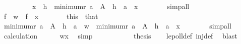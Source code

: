 \begin{isabellebody}
\ \ \ \ \ \ \ \ \ {\isachardoublequoteopen}x\ {\isacharequal}{\kern0pt}\ h\ {\isacharbackquote}{\kern0pt}\ minimum{\isacharparenleft}{\kern0pt}r{\isacharcomma}{\kern0pt}\ {\isacharbraceleft}{\kern0pt}a\ {\isasymin}\ A\ {\isachardot}{\kern0pt}\ h\ {\isacharbackquote}{\kern0pt}\ a\ {\isacharequal}{\kern0pt}\ x{\isacharbraceright}{\kern0pt}{\isacharparenright}{\kern0pt}{\isachardoublequoteclose}\isanewline
\ \ \ \ \ \ \isamarkupfalse%
\ simp{\isacharunderscore}{\kern0pt}all\ \ \isanewline
\ \ \ \ \isamarkupfalse%
\isanewline
\ \ \ \ \isamarkupfalse%
\ {\isachardoublequoteopen}{\isacharquery}{\kern0pt}f\ {\isacharbackquote}{\kern0pt}\ w\ {\isacharequal}{\kern0pt}\ {\isacharquery}{\kern0pt}f\ {\isacharbackquote}{\kern0pt}\ x{\isachardoublequoteclose}\isanewline
\ \ \ \ \isamarkupfalse%
\ \isamarkupfalse%
\ this\ \ that\isanewline
\ \ \ \ \isamarkupfalse%
\ {\isachardoublequoteopen}minimum{\isacharparenleft}{\kern0pt}r{\isacharcomma}{\kern0pt}\ {\isacharbraceleft}{\kern0pt}a\ {\isasymin}\ A\ {\isachardot}{\kern0pt}\ h\ {\isacharbackquote}{\kern0pt}\ a\ {\isacharequal}{\kern0pt}\ w{\isacharbraceright}{\kern0pt}{\isacharparenright}{\kern0pt}\ {\isacharequal}{\kern0pt}\ minimum{\isacharparenleft}{\kern0pt}r{\isacharcomma}{\kern0pt}\ {\isacharbraceleft}{\kern0pt}a\ {\isasymin}\ A\ {\isachardot}{\kern0pt}\ h\ {\isacharbackquote}{\kern0pt}\ a\ {\isacharequal}{\kern0pt}\ x{\isacharbraceright}{\kern0pt}{\isacharparenright}{\kern0pt}{\isachardoublequoteclose}\isanewline
\ \ \ \ \ \ \isamarkupfalse%
\ simp{\isacharunderscore}{\kern0pt}all\isanewline
\ \ \ \ \isamarkupfalse%
\ \isamarkupfalse%
\ calculation{\isacharparenleft}{\kern0pt}{}{\isacharcomma}{\kern0pt}{}{\isacharcomma}{\kern0pt}{}{\isacharparenright}{\kern0pt}\isanewline
\ \ \ \ \isamarkupfalse%
\ {\isachardoublequoteopen}w{\isacharequal}{\kern0pt}x{\isachardoublequoteclose}\ \isamarkupfalse%
\ simp\isanewline
\ \ \ \ \isamarkupfalse%
\isanewline
\ \ \isamarkupfalse%
\isanewline
\ \ \isamarkupfalse%
\ {\isacharquery}{\kern0pt}thesis\isanewline
\ \ \isamarkupfalse%
\ lepoll{\isacharunderscore}{\kern0pt}def\ inj{\isacharunderscore}{\kern0pt}def\ \isamarkupfalse%
\ blast\isanewline
{}\isamarkupfalse%
%
\endisatagproof
{\isafoldproof}%
%
\isadelimproof
\isanewline
%
\endisadelimproof

\end{isabellebody}
